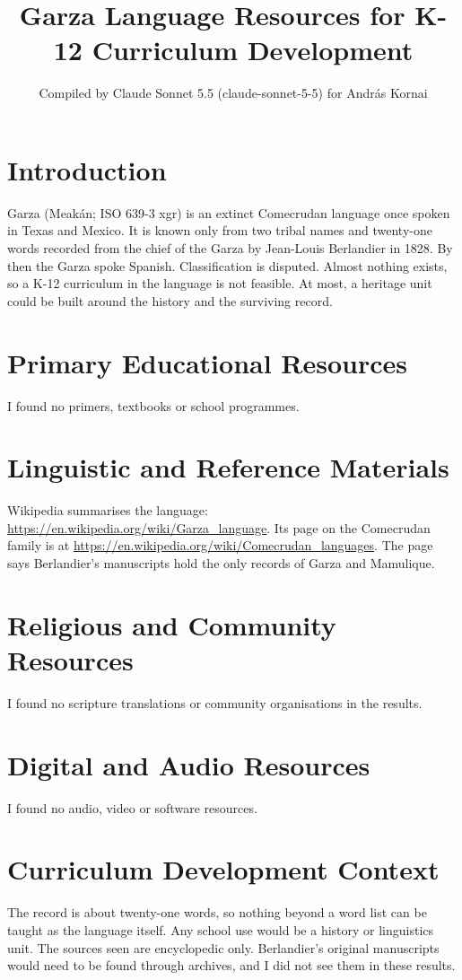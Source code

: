 \documentclass[12pt]{article}
\title{Garza Language Resources for K-12 Curriculum Development}
\author{Compiled by Claude Sonnet 5.5 (claude-sonnet-5-5) for Andr\'as Kornai}
\date{}
\begin{document}
\maketitle

\section{Introduction}
Garza (Meak\'an; ISO 639-3 xgr) is an extinct Comecrudan language once spoken in Texas and Mexico. It is known only from two tribal names and twenty-one words recorded from the chief of the Garza by Jean-Louis Berlandier in 1828. By then the Garza spoke Spanish. Classification is disputed. Almost nothing exists, so a K-12 curriculum in the language is not feasible. At most, a heritage unit could be built around the history and the surviving record.

\section{Primary Educational Resources}
I found no primers, textbooks or school programmes.

\section{Linguistic and Reference Materials}
Wikipedia summarises the language: \url{https://en.wikipedia.org/wiki/Garza_language}. Its page on the Comecrudan family is at \url{https://en.wikipedia.org/wiki/Comecrudan_languages}. The page says Berlandier's manuscripts hold the only records of Garza and Mamulique.

\section{Religious and Community Resources}
I found no scripture translations or community organisations in the results.

\section{Digital and Audio Resources}
I found no audio, video or software resources.

\section{Curriculum Development Context}
The record is about twenty-one words, so nothing beyond a word list can be taught as the language itself. Any school use would be a history or linguistics unit. The sources seen are encyclopedic only. Berlandier's original manuscripts would need to be found through archives, and I did not see them in these results.
\end{document}
